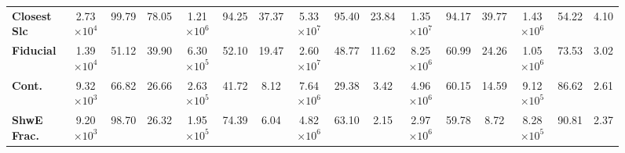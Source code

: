 \begin{figure}
\begin{scriptsize}
\begin{tabular}{|l|ccc|ccc|ccc|ccc|ccc|}
\textbf{Closest Slc}  & 2.73$\times 10^4$           & 99.79                                                               & 78.05                                      & 1.21$\times 10^6$ & 94.25                                                                 & 37.37                                        & 5.33$\times 10^7$ & 95.40                                                                  & 23.84                                         & 1.35$\times 10^7$          & 94.17                                                              & 39.77                                     & 1.43$\times 10^6$ & 54.22                                                                 & 4.10 \\
\textbf{Fiducial}     & 1.39$\times 10^4$           & 51.12                                                               & 39.90                                      & 6.30$\times 10^5$ & 52.10                                                                 & 19.47                                        & 2.60$\times 10^7$          & 48.77                                                                  & 11.62                                         & 8.25$\times 10^6$          & 60.99                                                              & 24.26                                     & 1.05$\times 10^6$             & 73.53                                                                 & 3.02                                         \\
\textbf{Cont.}  & 9.32$\times 10^3$           & 66.82                                                               & 26.66                                      & 2.63$\times 10^5$             & 41.72                                                                 & 8.12                                         & 7.64$\times 10^6$              & 29.38                                                                  & 3.42                                          & 4.96$\times 10^6$          & 60.15                                                              & 14.59                                     & 9.12$\times 10^5$             & 86.62                                                                 & 2.61                                         \\
\textbf{ShwE Frac.}  & 9.20$\times 10^3$           & 98.70                                                               & 26.32                                      & 1.95$\times 10^5$             & 74.39                                                                 & 6.04                                         & 4.82$\times 10^6$              & 63.10                                                                  & 2.15                                          & 2.97$\times 10^6$          & 59.78                                                              & 8.72                                      & 8.28$\times 10^5$             & 90.81                                                                 & 2.37                                         \\

\end{tabular}
\end{scriptsize}
\end{figure}
